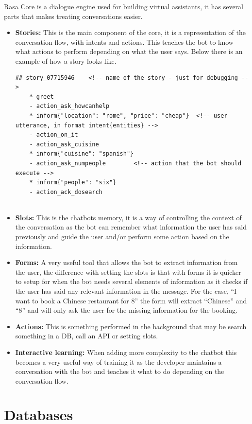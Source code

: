 Rasa Core is a dialogue engine used for building virtual assistants, it has several parts that makes treating conversations easier.
\begin{itemize}
	\item {\textbf{Stories:} This is the main component of the core, it is a representation of the conversation flow, with intents and actions. This teaches the bot to know what actions to perform depending on what the user says. Below there is an example of how a story looks like.
		
	\begin{lstlisting}[caption={Story Example},captionpos=b]
	## story_07715946    <!-- name of the story - just for debugging -->
	* greet
	- action_ask_howcanhelp
	* inform{"location": "rome", "price": "cheap"}  <!-- user utterance, in format intent{entities} -->
	- action_on_it
	- action_ask_cuisine
	* inform{"cuisine": "spanish"}
	- action_ask_numpeople        <!-- action that the bot should execute -->
	* inform{"people": "six"}
	- action_ack_dosearch
	
	\end{lstlisting}
	}
	\item {\textbf{Slots:} This is the chatbots memory, it is a way of controlling the context of the conversation as the bot can remember what information the user has said previously and guide the user and/or perform some action based on the information.}
	\item {\textbf{Forms:} A very useful tool that allows the bot to extract information from the user, the difference with setting the slots is that with forms it is quicker to setup for when the bot needs several elements of information as it checks if the user has said any relevant information in the message. For the case, “I want to book a Chinese restaurant for 8” the form will extract “Chinese” and “8” and will only ask the user for the missing information for the booking.}
	\item {\textbf{Actions:} This is something performed in the background that may be search something in a DB, call an API or setting slots.}
	\item {\textbf{Interactive learning:} When adding more complexity to the chatbot this becomes a very useful way of training it as the developer maintains a conversation with the bot and teaches it what to do depending on the conversation flow.}
\end{itemize}

\section{Databases}\label{sec:chap3_db}

